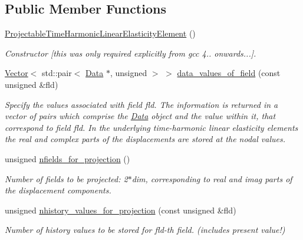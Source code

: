 \subsection*{Public Member Functions}
\begin{DoxyCompactItemize}
\item 
\hyperlink{classoomph_1_1ProjectableTimeHarmonicLinearElasticityElement_a74a8d33ebab8ac2e3dc76b35a71eb794}{Projectable\+Time\+Harmonic\+Linear\+Elasticity\+Element} ()
\begin{DoxyCompactList}\small\item\em Constructor \mbox{[}this was only required explicitly from gcc 4.. onwards...\mbox{]}. \end{DoxyCompactList}\item 
\hyperlink{classoomph_1_1Vector}{Vector}$<$ std\+::pair$<$ \hyperlink{classoomph_1_1Data}{Data} $\ast$, unsigned $>$ $>$ \hyperlink{classoomph_1_1ProjectableTimeHarmonicLinearElasticityElement_aa7e723386c104650e9b8f7f3e856786b}{data\+\_\+values\+\_\+of\+\_\+field} (const unsigned \&fld)
\begin{DoxyCompactList}\small\item\em Specify the values associated with field fld. The information is returned in a vector of pairs which comprise the \hyperlink{classoomph_1_1Data}{Data} object and the value within it, that correspond to field fld. In the underlying time-\/harmonic linear elasticity elements the real and complex parts of the displacements are stored at the nodal values. \end{DoxyCompactList}\item 
unsigned \hyperlink{classoomph_1_1ProjectableTimeHarmonicLinearElasticityElement_a2c8f219649069bad135a0a1ca7bcd907}{nfields\+\_\+for\+\_\+projection} ()
\begin{DoxyCompactList}\small\item\em Number of fields to be projected\+: 2$\ast$dim, corresponding to real and imag parts of the displacement components. \end{DoxyCompactList}\item 
unsigned \hyperlink{classoomph_1_1ProjectableTimeHarmonicLinearElasticityElement_a4615e8cf28f14603d0215006db2218fc}{nhistory\+\_\+values\+\_\+for\+\_\+projection} (const unsigned \&fld)
\begin{DoxyCompactList}\small\item\em Number of history values to be stored for fld-\/th field. (includes present value!) \end{DoxyCompactList}\item 

\end{DoxyCompactItemize}
